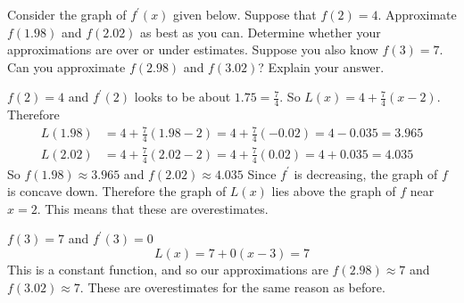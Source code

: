 \documentclass[nooutcomes]{ximera}
\begin{document}
\begin{problem}
Consider the graph of $f^\prime (x)$ given below.  Suppose that $f(2) = 4$.  Approximate 
$f(1.98)$ and $f(2.02)$ as best as you can.  Determine whether your approximations are over or under estimates.  
Suppose you also know $f(3) = 7$.  
Can you approximate $f(2.98)$ and $f(3.02)$?  
Explain your answer.

	
		\begin{freeResponse}
		$f(2) = 4$ and $f^\prime (2)$ looks to be about $1.75 = \frac{7}{4}$.  So $L(x) = 4 + \frac{7}{4} (x-2)$.  Therefore
			\begin{align*}
			L(1.98) &= 4 + \frac{7}{4} (1.98-2) = 4 + \frac{7}{4} (-0.02) = 4-0.035 = 3.965 \\
			L(2.02) &= 4 + \frac{7}{4} (2.02-2) = 4 + \frac{7}{4} (0.02) = 4+0.035 = 4.035
			\end{align*}
		So $f(1.98)\approx 3.965$ and $f(2.02)\approx 4.035$ 
Since $f^\prime$ is decreasing, the graph of $f$ is concave down.  Therefore the graph of $L(x)$ lies above the graph of $f$ near $x=2$.  This means that these are overestimates.

		$f(3)=7$ and $f^\prime (3)=0$ 
		$$ L(x) =7+0(x-3) = 7$$
		This is a constant function, and so our approximations are $f(2.98)\approx 7$ and $f(3.02)\approx 7$. These are overestimates for the same reason as before.
		\end{freeResponse}
		
		
		

\end{problem}
	
	
	
	
	
	
	
	
			
			
\end{document}
